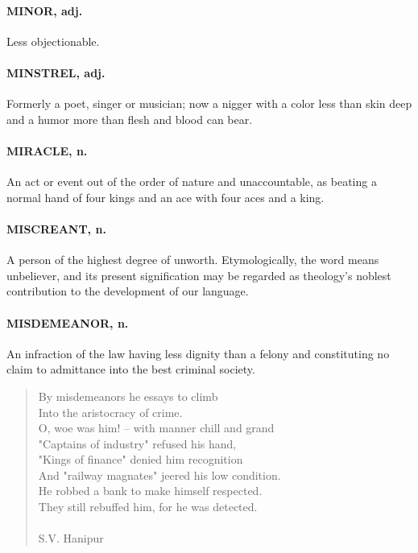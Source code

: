 \documentclass[11pt]{article}
\begin{document}
\paragraph{MINOR, adj.}  Less objectionable.

\paragraph{MINSTREL, adj.}  Formerly a poet, singer or musician; now a nigger with
a color less than skin deep and a humor more than flesh and blood can
bear.

\paragraph{MIRACLE, n.}  An act or event out of the order of nature and
unaccountable, as beating a normal hand of four kings and an ace with
four aces and a king.

\paragraph{MISCREANT, n.}  A person of the highest degree of unworth.
Etymologically, the word means unbeliever, and its present
signification may be regarded as theology's noblest contribution to
the development of our language.

\paragraph{MISDEMEANOR, n.}  An infraction of the law having less dignity than a
felony and constituting no claim to admittance into the best criminal
society.

\begin{quote}   By misdemeanors he essays to climb \\
  Into the aristocracy of crime. \\
  O, woe was him! -- with manner chill and grand \\
  "Captains of industry" refused his hand, \\
  "Kings of finance" denied him recognition \\
  And "railway magnates" jeered his low condition. \\
  He robbed a bank to make himself respected. \\
  They still rebuffed him, for he was detected. \\
 \\
S.V. Hanipur \end{quote}
\end{document}
